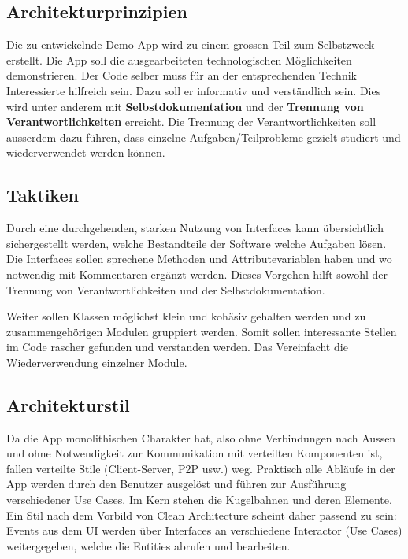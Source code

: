 \subsection{Architekturprinzipien}

Die zu entwickelnde Demo-App wird zu einem grossen Teil zum Selbstzweck erstellt.
Die App soll die ausgearbeiteten technologischen Möglichkeiten demonstrieren.
Der Code selber muss für an der entsprechenden Technik Interessierte hilfreich sein.
Dazu soll er informativ und verständlich sein.
Dies wird unter anderem mit \textbf{Selbstdokumentation} und der \textbf{Trennung von Verantwortlichkeiten} erreicht.
Die Trennung der Verantwortlichkeiten soll ausserdem dazu führen, dass einzelne Aufgaben/Teilprobleme gezielt studiert und wiederverwendet werden können.

\subsection{Taktiken}

Durch eine durchgehenden, starken Nutzung von Interfaces kann übersichtlich sichergestellt werden, welche Bestandteile der Software welche Aufgaben lösen. Die Interfaces sollen sprechene Methoden und Attributevariablen haben und wo notwendig mit Kommentaren ergänzt werden. Dieses Vorgehen hilft sowohl der Trennung von Verantwortlichkeiten und der Selbstdokumentation.

Weiter sollen Klassen möglichst klein und kohäsiv gehalten werden und zu zusammengehörigen Modulen gruppiert werden. Somit sollen interessante Stellen im Code rascher gefunden und verstanden werden. Das Vereinfacht die Wiederverwendung einzelner Module.

\subsection{Architekturstil}

Da die App monolithischen Charakter hat, also ohne Verbindungen nach Aussen und ohne Notwendigkeit zur Kommunikation mit verteilten Komponenten ist, fallen verteilte Stile (Client-Server, P2P usw.) weg.
Praktisch alle Abläufe in der App werden durch den Benutzer ausgelöst und führen zur Ausführung verschiedener Use Cases. Im Kern stehen die Kugelbahnen und deren Elemente.
Ein Stil nach dem Vorbild von Clean Architecture scheint daher passend zu sein: Events aus dem UI werden über Interfaces an verschiedene Interactor (Use Cases) weitergegeben, welche die Entities abrufen und bearbeiten.

